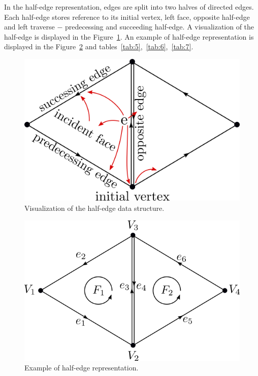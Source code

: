 In the half-edge representation, edges are split into two halves of directed edges.
Each half-edge
stores reference to its initial vertex, left face, opposite half-edge and left
traverse $-$ predecessing and succeeding half-edge. A visualization of the
half-edge is displayed in the Figure~\ref{img:32}. An example of half-edge
representation is displayed in the Figure~\ref{img:31} and 
tables~\ref{tab:5},~\ref{tab:6},~\ref{tab:7}.

\begin{figure}
    \centerline{\includegraphics[scale=0.5]{images/img32}}
    \caption[Visualisation of the half-edge data structure]
    {Visualization of the half-edge data structure.}
    \label{img:32}
\end{figure}

\begin{figure}
    \centerline{\includegraphics[scale=0.5]{images/img31}}
    \caption[Example of half-edge representation]
    {Example of half-edge representation.}
    \label{img:31}
\end{figure}

